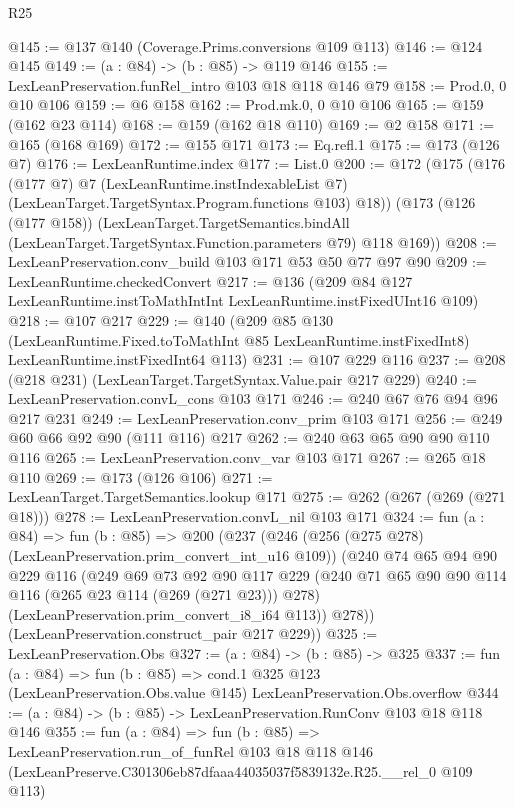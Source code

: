 \begin{lexlean}{R25}
\begin{coremodule}
@145 := @137 @140 (Coverage.Prims.conversions @109 @113)
@146 := @124 @145
@149 := (a : @84) -> (b : @85) -> @119 @146
@155 := LexLeanPreservation.funRel_intro @103 @18 @118 @146 @79
@158 := Prod.{0, 0} @10 @106
@159 := @6 @158
@162 := Prod.mk.{0, 0} @10 @106
@165 := @159 (@162 @23 @114)
@168 := @159 (@162 @18 @110)
@169 := @2 @158
@171 := @165 (@168 @169)
@172 := @155 @171
@173 := Eq.refl.{1}
@175 := @173 (@126 @7)
@176 := LexLeanRuntime.index
@177 := List.{0}
@200 := @172
    (@175
      (@176
        (@177 @7)
        @7
        (LexLeanRuntime.instIndexableList @7)
        (LexLeanTarget.TargetSyntax.Program.functions @103)
        @18))
    (@173
      (@126 (@177 @158))
      (LexLeanTarget.TargetSemantics.bindAll
        (LexLeanTarget.TargetSyntax.Function.parameters @79)
        @118
        @169))
@208 := LexLeanPreservation.conv_build @103 @171 @53 @50 @77 @97 @90
@209 := LexLeanRuntime.checkedConvert
@217 := @136 (@209 @84 @127 LexLeanRuntime.instToMathIntInt LexLeanRuntime.instFixedUInt16 @109)
@218 := @107 @217
@229 := @140
    (@209
      @85
      @130
      (LexLeanRuntime.Fixed.toToMathInt @85 LexLeanRuntime.instFixedInt8)
      LexLeanRuntime.instFixedInt64
      @113)
@231 := @107 @229 @116
@237 := @208 (@218 @231) (LexLeanTarget.TargetSyntax.Value.pair @217 @229)
@240 := LexLeanPreservation.convL_cons @103 @171
@246 := @240 @67 @76 @94 @96 @217 @231
@249 := LexLeanPreservation.conv_prim @103 @171
@256 := @249 @60 @66 @92 @90 (@111 @116) @217
@262 := @240 @63 @65 @90 @90 @110 @116
@265 := LexLeanPreservation.conv_var @103 @171
@267 := @265 @18 @110
@269 := @173 (@126 @106)
@271 := LexLeanTarget.TargetSemantics.lookup @171
@275 := @262 (@267 (@269 (@271 @18)))
@278 := LexLeanPreservation.convL_nil @103 @171
@324 := fun (a : @84) =>
  fun (b : @85) =>
  @200
    (@237
      (@246
        (@256 (@275 @278) (LexLeanPreservation.prim_convert_int_u16 @109))
        (@240
          @74
          @65
          @94
          @90
          @229
          @116
          (@249
            @69
            @73
            @92
            @90
            @117
            @229
            (@240 @71 @65 @90 @90 @114 @116 (@265 @23 @114 (@269 (@271 @23))) @278)
            (LexLeanPreservation.prim_convert_i8_i64 @113))
          @278))
      (LexLeanPreservation.construct_pair @217 @229))
@325 := LexLeanPreservation.Obs
@327 := (a : @84) -> (b : @85) -> @325
@337 := fun (a : @84) =>
  fun (b : @85) =>
  cond.{1} @325 @123 (LexLeanPreservation.Obs.value @145) LexLeanPreservation.Obs.overflow
@344 := (a : @84) -> (b : @85) -> LexLeanPreservation.RunConv @103 @18 @118 @146
@355 := fun (a : @84) =>
  fun (b : @85) =>
  LexLeanPreservation.run_of_funRel
    @103
    @18
    @118
    @146
    (LexLeanPreserve.C301306eb87dfaaa44035037f5839132e.R25.__rel_0 @109 @113)
\end{coremodule}
\end{lexlean}
